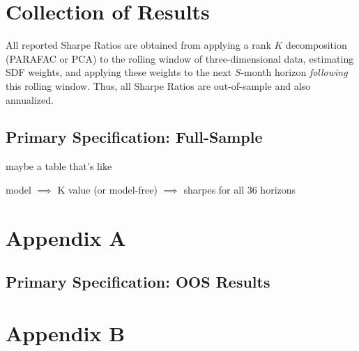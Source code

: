 \documentclass{article}
\begin{document}
\newpage

\section{Collection of Results}

All reported Sharpe Ratios are obtained from applying a rank $K$ decomposition (PARAFAC or PCA) to the rolling window of 
three-dimensional data, estimating SDF weights, and applying these weights to the next $S$-month horizon 
\emph{following} this rolling window. Thus, all Sharpe Ratios are out-of-sample and also annualized.


\listoffigures

\newpage

\subsection{Primary Specification: Full-Sample}



maybe a table that's like 

model $\implies$ K value (or model-free) $\implies$ sharpes for all 36 horizons







\newpage

\section{Appendix A}

\subsection{Primary Specification: OOS Results}

    







\newpage


\section{Appendix B}


\end{document}
